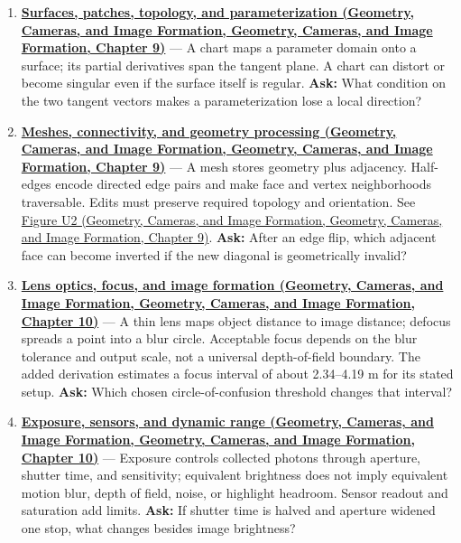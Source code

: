 \begin{enumerate}
\item
  \textbf{\href{../03-Geometry-Cameras-and-Image-Formation/main.pdf\#nameddest=03-visual-computing-i-ch002-surfaces-patches-topology-and-parameterization}{Surfaces, patches, topology, and parameterization (Geometry, Cameras, and Image Formation, Geometry, Cameras, and Image Formation, Chapter 9)}} --- A chart maps a parameter domain onto a surface; its partial derivatives span the tangent plane. A chart can distort or become singular even if the surface itself is regular. \textbf{Ask:} What condition on the two tangent vectors makes a parameterization lose a local direction?
\item
  \textbf{\href{../03-Geometry-Cameras-and-Image-Formation/main.pdf\#nameddest=03-visual-computing-i-ch002-meshes-connectivity-and-geometry-processing}{Meshes, connectivity, and geometry processing (Geometry, Cameras, and Image Formation, Geometry, Cameras, and Image Formation, Chapter 9)}} --- A mesh stores geometry plus adjacency. Half-edges encode directed edge pairs and make face and vertex neighborhoods traversable. Edits must preserve required topology and orientation. See \href{../03-Geometry-Cameras-and-Image-Formation/main.pdf\#nameddest=03-visual-computing-i-ch002-figure-u2---a-half-edge-separates-face-traversal-from-edge-traversal}{Figure U2 (Geometry, Cameras, and Image Formation, Geometry, Cameras, and Image Formation, Chapter 9)}. \textbf{Ask:} After an edge flip, which adjacent face can become inverted if the new diagonal is geometrically invalid?
\item
  \textbf{\href{../03-Geometry-Cameras-and-Image-Formation/main.pdf\#nameddest=03-visual-computing-i-ch003-lens-optics-focus-and-image-formation}{Lens optics, focus, and image formation (Geometry, Cameras, and Image Formation, Geometry, Cameras, and Image Formation, Chapter 10)}} --- A thin lens maps object distance to image distance; defocus spreads a point into a blur circle. Acceptable focus depends on the blur tolerance and output scale, not a universal depth-of-field boundary. The added derivation estimates a focus interval of about 2.34--4.19 m for its stated setup. \textbf{Ask:} Which chosen circle-of-confusion threshold changes that interval?
\item
  \textbf{\href{../03-Geometry-Cameras-and-Image-Formation/main.pdf\#nameddest=03-visual-computing-i-ch003-exposure-sensors-and-dynamic-range}{Exposure, sensors, and dynamic range (Geometry, Cameras, and Image Formation, Geometry, Cameras, and Image Formation, Chapter 10)}} --- Exposure controls collected photons through aperture, shutter time, and sensitivity; equivalent brightness does not imply equivalent motion blur, depth of field, noise, or highlight headroom. Sensor readout and saturation add limits. \textbf{Ask:} If shutter time is halved and aperture widened one stop, what changes besides image brightness?

\end{enumerate}
